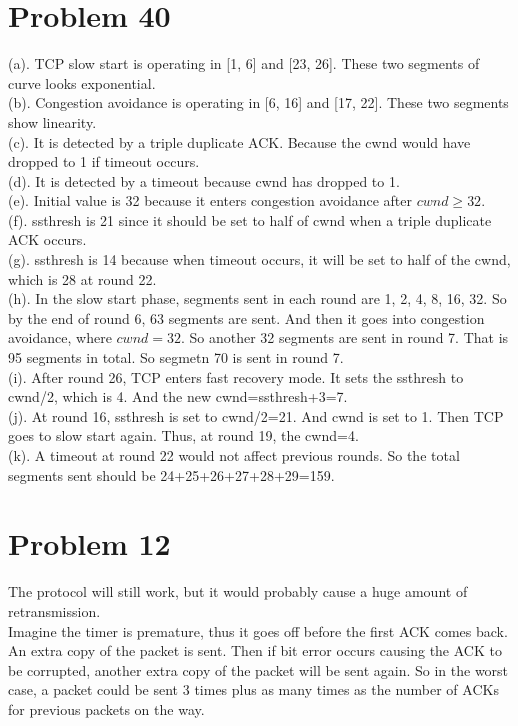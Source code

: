 \documentclass[titlepage, paper=a4, fontsize=11pt]{scrartcl} %
\numberwithin{equation}{section} %
\numberwithin{table}{section} %
\begin{document}
\section*{Problem 40}
(a).
TCP slow start is operating in [1, 6] and [23, 26]. These two segments of curve looks exponential. \\
(b).
Congestion avoidance is operating in [6, 16] and [17, 22]. These two segments show linearity. \\
(c).
It is detected by a triple duplicate ACK. Because the cwnd would have dropped to 1 if timeout occurs. \\
(d).
It is detected by a timeout because cwnd has dropped to 1. \\
(e).
Initial value is 32 because it enters congestion avoidance after $cwnd \geq 32$. \\
(f).
ssthresh is 21 since it should be set to half of cwnd when a triple duplicate ACK occurs. \\
(g).
ssthresh is 14 because when timeout occurs, it will be set to half of the cwnd, which is 28 at round 22. \\
(h).
In the slow start phase, segments sent in each round are 1, 2, 4, 8, 16, 32. So by the end of round 6, 63 segments are sent. And then it goes into congestion avoidance, where $cwnd=32$. So another 32 segments are sent in round 7. That is 95 segments in total. So segmetn 70 is sent in round 7. \\
(i).
After round 26, TCP enters fast recovery mode. It sets the ssthresh to cwnd/2, which is 4. And the new cwnd=ssthresh+3=7. \\
(j).
At round 16, ssthresh is set to cwnd/2=21. And cwnd is set to 1. Then TCP goes to slow start again. Thus, at round 19, the cwnd=4. \\
(k).
A timeout at round 22 would not affect previous rounds. So the total segments sent should be 24+25+26+27+28+29=159. \\



\section*{Problem 12}
The protocol will still work, but it would probably cause a huge amount of retransmission. \\
Imagine the timer is premature, thus it goes off before the first ACK comes back. An extra copy of
the packet is sent. Then if bit error occurs causing the ACK to be corrupted, another extra copy of the packet will be sent again. So in the worst case, a packet could be sent 3 times plus as many times as the number of ACKs for previous packets on the way.
\\
\end{document}
